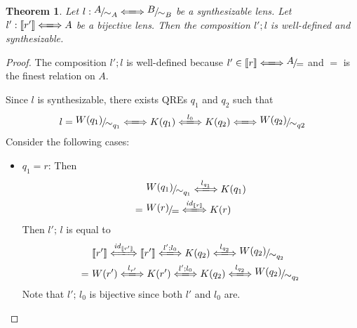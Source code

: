 \documentclass[a4paper,11pt] {article}
\theoremstyle{plain}
\newtheorem{theorem}{Theorem}[section]
\newcommand{\lensbetween}[1]{\xLongleftrightarrow{#1}}
\newcommand{\niceFrac}[2]{%
    \raise.5ex\hbox{$#1$}%
    \kern-.1em/\kern-.15em%
    \lower.25ex\hbox{$#2$}}
\begin{document}
\begin{theorem}
  Let $l: \niceFrac{A}{\sim_A} \lensbetween{} \niceFrac{B}{\sim_B}$ be a
  synthesizable lens. Let 
  $l': \llbracket r' \rrbracket \lensbetween{} A$
  be a bijective lens. Then the composition
  $l'; l$ is well-defined and synthesizable.
\end{theorem}
\begin{proof}
  The composition $l'; l$ is well-defined because
  $l' \in \llbracket r \rrbracket \lensbetween{} \niceFrac{A}{=}$
  and $=$ is the finest relation on $A$.

  Since $l$ is synthesizable, there exists QREs $q_1$ and $q_2$ such
  that
  \begin{align*}
    l = \niceFrac{W(q_1)}{\sim_{q_1}} \lensbetween{}
    K(q_1) \lensbetween{l_0} K(q_2) \lensbetween{}
    \niceFrac{W(q_2)}{\sim_{q2}}
  \end{align*}
  Consider the following cases:
  \begin{itemize}
  \item $q_1 = r$:
    Then
    \begin{align*}
      &\niceFrac{W(q_1)}{\sim_{q_1}}
      \lensbetween{l_{q_1}} K(q_1) \\
      =~&\niceFrac{W(r)}{=}
      \lensbetween{\mathit{id}_{\llbracket r \rrbracket}} K(r) 
    \end{align*}
    Then $l'; \, l$ is equal to
    \begin{align*}
      &\llbracket r' \rrbracket
      \lensbetween{\mathit{id}_{\llbracket r' \rrbracket}}
      \llbracket r' \rrbracket
      \lensbetween{l'; l_0} K(q_2) \lensbetween{l_{q_2}}
      \niceFrac{W(q_2)}{\sim_{q_2}} \\
      =~&
      W(r') \lensbetween{l_{r'}} K(r')
      \lensbetween{l'; l_0} K(q_2) \lensbetween{l_{q_2}}
      \niceFrac{W(q_2)}{\sim_{q_2}}
    \end{align*}
    Note that $l';\, l_0$ is bijective since both $l'$ and $l_0$ are.
    

\end{itemize}
\end{proof}
\end{document}

